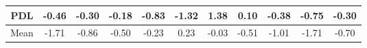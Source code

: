 \documentclass[11pt,a4paper]{report}
\begin{document}
\begin{centering}
\begin{adjustwidth}{-2in}{-1in}
\begin{longtable}{ | c || c | c | c | c | c | c | c | c | c || c |}
PDL &  \cellcolor[HTML]{FFF7F7} -0.46 &  \cellcolor[HTML]{FFF7F7} -0.30 &  \cellcolor[HTML]{FFF7F7} -0.18 &  \cellcolor[HTML]{FFE7E7} -0.83 &  \cellcolor[HTML]{FFDFDF} -1.32 &  \cellcolor[HTML]{DFDFFF} 1.38 &  \cellcolor[HTML]{FFFFFF} 0.10 &  \cellcolor[HTML]{FFF7F7} -0.38 &  \cellcolor[HTML]{FFEFEF} -0.75 &  \cellcolor[HTML]{FFF7F7} -0.30 \\
\hline
\hline
Mean  &  \cellcolor[HTML]{FFD7D7} -1.71 &  \cellcolor[HTML]{FFE7E7} -0.86 &  \cellcolor[HTML]{FFEFEF} -0.50 &  \cellcolor[HTML]{FFF7F7} -0.23 &  \cellcolor[HTML]{F7F7FF} 0.23 &  \cellcolor[HTML]{FFFFFF} -0.03 &  \cellcolor[HTML]{FFEFEF} -0.51 &  \cellcolor[HTML]{FFE7E7} -1.01 &  \cellcolor[HTML]{FFD7D7} -1.71 &  \cellcolor[HTML]{FFEFEF} -0.70 \\
\hline
\end{longtable}

\end{adjustwidth}



\end{centering}
\end{document}
